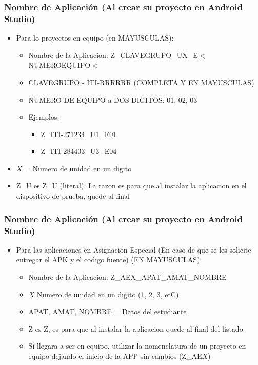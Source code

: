 \begin{frame}
\frametitle{Nombre de Aplicaci\'on (Al crear su proyecto en Android Studio)}
\begin{itemize}

\item Para lo proyectos en equipo (en MAYUSCULAS):
\begin{itemize}
\item Nombre de la Aplicacion: Z\_CLAVEGRUPO\_UX\_E$<$NUMEROEQUIPO$<$
\item CLAVEGRUPO - ITI-RRRRRR (COMPLETA Y EN MAYUSCULAS)
\item NUMERO DE EQUIPO a DOS DIGITOS: 01, 02, 03
\item Ejemplos:
\begin{itemize}
\item \tiny{Z\_ITI-271234\_U1\_E01}
\item \tiny{Z\_ITI-284433\_U3\_E04}
\end{itemize}

\end{itemize}
\item $X$ = Numero de unidad en un digito
\item Z\_U es Z\_U (literal). La razon es para que al instalar la aplicacion en el dispositivo de prueba, quede al final

\end{itemize}


\end{frame}



\begin{frame}
\frametitle{Nombre de Aplicaci\'on (Al crear su proyecto en Android Studio)}
\begin{itemize}
\item Para las aplicaciones en Asignacion Especial (En caso de que se les solicite entregar el APK y el codigo fuente) (EN MAYUSCULAS):
\begin{itemize}
\item Nombre de la Aplicacion: Z\_AEX\_APAT\_AMAT\_NOMBRE
\item $X$ Numero de unidad en un digito (1, 2, 3, etC)
\item APAT, AMAT, NOMBRE = Datos del estudiante
\item Z es Z, es para que al instalar la aplicacion  quede al final del listado
\item Si llegara a ser en equipo, utilizar la nomenclatura de un proyecto en equipo dejando el inicio de la APP sin cambios (Z\_AE$X$)
\end{itemize}
\end{itemize}

\end{frame}

